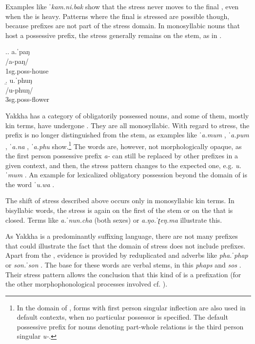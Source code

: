Examples like \emph{ˈkam.ni.bak}  show that the stress never moves to the final , even when the  is heavy. Patterns where the final  is stressed are possible though, because prefixes are not part of the stress domain. In monosyllabic nouns that host a possessive prefix, the stress generally remains on the stem, as in  \Next.


\ex.\a. \glll a.ˈpaŋ\\
/a-paŋ/\\
{\sc 1sg.poss-}house\\
\b. \glll u.ˈphuŋ\\
/u-phuŋ/\\
{\sc 3sg.poss-}flower\\


Yakkha has a category of obligatorily possessed nouns, and some of them, mostly kin terms, have undergone  . They are all monosyllabic. With regard to  stress, the prefix is no longer distinguished from the stem, as examples like \emph{ˈa.mum} , \emph{ˈa.pum} , \emph{ˈa.na} , \emph{ˈa.phu}  show.\footnote{In the domain of , forms with first person singular inflection are also used in default contexts, when no particular possessor is specified. The default possessive prefix for nouns denoting part-whole relations is the third person singular \emph{u-}.} The words are, however, not morphologically opaque, as the first person possessive prefix \emph{a-} can still be replaced by other prefixes in a given context, and then, the stress pattern changes to the expected one, e.g. \emph{u.ˈmum} . An example for lexicalized obligatory possession beyond the domain of  is the word \emph{ˈu.wa} .

The shift of stress described above occurs only in monosyllabic kin terms. In bisyllabic words, the stress is again on the first   of the stem or on the  that is closed. Terms like \emph{a.ˈnun.cha}  (both sexes) or \emph{a.ŋo.ˈʈeŋ.ma}  illustrate this.


As Yakkha is a predominantly suffixing language, there are not many prefixes that could illustrate the fact that the domain of stress does not include prefixes. Apart from the , evidence is provided by reduplicated  and adverbs like \emph{pha.ˈphap}  or \emph{son.ˈson} . The base for these words are verbal stems, in this  \emph{phaps}  and \emph{sos} . Their stress pattern allows the conclusion that this kind of  is a prefixation (for the other morphophonological processes involved cf. ).


